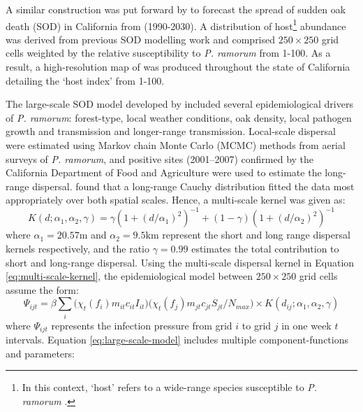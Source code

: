 A similar construction was put forward by \cite{meentemeyer2011epidemiological} to 
forecast the spread of sudden oak death (SOD) in California from (1990-2030).
A distribution of host\footnote{In this context, `host' refers to a wide-range
species susceptible to \textit{P. ramorum} \cite{tooley2004susceptibility}.
} abundance was derived from previous SOD modelling work 
\cite{meentemeyer2004mapping} and comprised $\mathrm{250 \times 250}$ grid cells
weighted by the relative susceptibility to \textit{P. ramorum} from 1-100. As a result,
a high-resolution map of was produced throughout the state of California detailing the `host index'
from 1-100.

The large-scale SOD model developed by \cite{meentemeyer2011epidemiological} included several epidemiological 
drivers of \textit{P. ramorum}: forest-type, local weather conditions, oak density, local pathogen growth and transmission
and longer-range transmission. Local-scale dispersal were estimated
using Markov chain Monte Carlo (MCMC) methods from aerial surveys \cite{valachovic2008wildland} 
of \textit{P. ramorum}, and positive sites (2001–2007) confirmed by the California Department of
Food and Agriculture were used to estimate the long-range dispersal. \cite{meentemeyer2004mapping}
found that a long-range Cauchy distribution fitted the data most appropriately over both spatial scales.
Hence, a multi-scale kernel was given as:
\begin{equation}
\label{eq:multi-scale-kernel}
    K(d; \alpha_1, \alpha_2, \gamma) = \gamma( 1 + (d/\alpha_1)^2 )^{-1} + (1 - \gamma)( 1 + (d/\alpha_2)^2 )^{-1}
\end{equation}
where $\alpha_1 = 20.57\mathrm{m}$ and $\alpha_2 = 9.5\mathrm{km}$ represent the short and long range dispersal
kernels respectively, and the ratio $\gamma=0.99$ estimates the total contribution to short and
long-range dispersal. Using the multi-scale dispersal kernel in Equation \ref{eq:multi-scale-kernel},
the epidemiological model between $\mathrm{250 \times 250}$ grid cells assume the form:
\begin{equation}
\label{eq:large-scale-model}
    \Psi_{ijt} = \beta \sum_i \big(\chi_t (f_i) m_{it} c_{it} I_{it} \big) \big( \chi_t(f_j) m_{jt} c_{jt} S_{jt} /N_{max} \big) \times K(d_{ij}; \alpha_1, \alpha_2, \gamma)
\end{equation}
where $\Psi_{ijt}$ represents the infection pressure from grid $i$ to grid $j$ in one week $t$ intervals. 
Equation \ref{eq:large-scale-model} includes multiple component-functions and parameters: 
